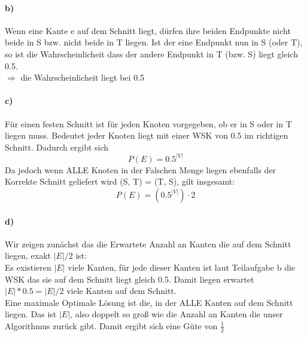 \documentclass[a4paper]{article}
\begin{document}
\paragraph*{b)}
Wenn eine Kante e auf dem Schnitt liegt, dürfen ihre beiden Endpunkte nicht beide in S bzw. nicht
beide in T liegen. Ist der eine Endpunkt nun in S (oder T), so ist die Wahrscheinlicheit dass der 
andere Endpunkt in T (bzw. S) liegt gleich 0.5. \\
$\Rightarrow$ die Wahrscheinlicheit liegt bei 0.5
\paragraph*{c)}
Für einen festen Schnitt ist für jeden Knoten vorgegeben, ob er in S oder in T liegen muss. 
Bedeutet jeder Knoten liegt mit einer WSK von 0.5 im richtigen Schnitt. Dadurch
ergibt sich 
\[
    P(E) = 0.5^{|V|}  
\]
Da jedoch wenn ALLE Knoten in der Falschen Menge liegen ebenfalls der Korrekte Schnitt
geliefert wird (S, T) = (T, S), gilt insgesamt:
\[
    P(E) = (0.5^{|V|}) \cdot 2
\]
\paragraph*{d)}
Wir zeigen zunächst das die Erwartete Anzahl an Kanten die auf dem Schnitt liegen, exakt
$|E| / 2$ ist: \\
Es existieren $|E|$ viele Kanten, für jede dieser Kanten ist laut Teilaufgabe b die WSK
das sie auf dem Schnitt liegt gleich 0.5. Damit liegen erwartet $|E| * 0.5 = |E| / 2$ viele
Kanten auf dem Schnitt. \\
Eine maximale Optimale Lösung ist die, in der ALLE Kanten auf dem Schnitt liegen. Das ist
$|E|$, also doppelt so groß wie die Anzahl an Kanten die unser Algorithmus zurück gibt.
Damit ergibt sich eine Güte von $\frac{1}{2}$
\end{document}
